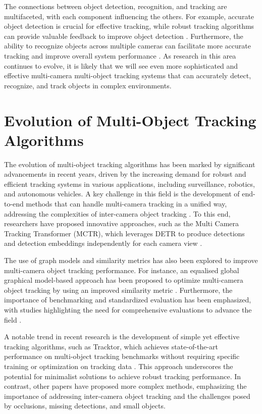 \documentclass[conference]{IEEEtran}
\begin{document}
The connections between object detection, recognition, and tracking are multifaceted, with each component influencing the others. For example, accurate object detection is crucial for effective tracking, while robust tracking algorithms can provide valuable feedback to improve object detection \cite{Detection, Recognition, and Tracking: A Survey}. Furthermore, the ability to recognize objects across multiple cameras can facilitate more accurate tracking and improve overall system performance \cite{MCTR: Multi Camera Tracking Transformer}. As research in this area continues to evolve, it is likely that we will see even more sophisticated and effective multi-camera multi-object tracking systems that can accurately detect, recognize, and track objects in complex environments.

\section{Evolution of Multi-Object Tracking Algorithms}
The evolution of multi-object tracking algorithms has been marked by significant advancements in recent years, driven by the increasing demand for robust and efficient tracking systems in various applications, including surveillance, robotics, and autonomous vehicles. A key challenge in this field is the development of end-to-end methods that can handle multi-camera tracking in a unified way, addressing the complexities of inter-camera object tracking \cite{Challenge of Multi-Camera Tracking}. To this end, researchers have proposed innovative approaches, such as the Multi Camera Tracking Transformer (MCTR), which leverages DETR to produce detections and detection embeddings independently for each camera view \cite{MCTR: Multi Camera Tracking Transformer}.

The use of graph models and similarity metrics has also been explored to improve multi-camera object tracking performance. For instance, an equalised global graphical model-based approach has been proposed to optimize multi-camera object tracking by using an improved similarity metric \cite{An equalised global graphical model-based approach for multi-camera object tracking}. Furthermore, the importance of benchmarking and standardized evaluation has been emphasized, with studies highlighting the need for comprehensive evaluations to advance the field \cite{Tracking the Trackers: An Analysis of the State of the Art in Multiple Object Tracking}.

A notable trend in recent research is the development of simple yet effective tracking algorithms, such as Tracktor, which achieves state-of-the-art performance on multi-object tracking benchmarks without requiring specific training or optimization on tracking data \cite{Tracking without bells and whistles}. This approach underscores the potential for minimalist solutions to achieve robust tracking performance. In contrast, other papers have proposed more complex methods, emphasizing the importance of addressing inter-camera object tracking and the challenges posed by occlusions, missing detections, and small objects.
\end{document}
